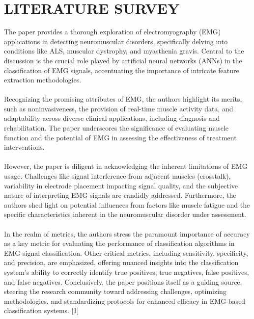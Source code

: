 \documentclass[ 12pt,a4paper,twocolumn,fleqn]{report}
\begin{document}
\chapter{LITERATURE SURVEY}
The paper provides a thorough exploration of electromyography (EMG) applications in detecting
neuromuscular disorders, specifically delving into conditions like ALS, muscular dystrophy, and
myasthenia gravis. Central to the discussion is the crucial role played by artificial neural networks
(ANNs) in the classification of EMG signals, accentuating the importance of intricate feature extraction
methodologies.
\\
\hfill
\\
Recognizing the promising attributes of EMG, the authors highlight its merits, such as noninvasiveness, the provision of real-time muscle activity data, and adaptability across diverse clinical
applications, including diagnosis and rehabilitation. The paper underscores the significance of
evaluating muscle function and the potential of EMG in assessing the effectiveness of treatment
interventions.
\\
\hfill
\\
However, the paper is diligent in acknowledging the inherent limitations of EMG usage. Challenges
like signal interference from adjacent muscles (crosstalk), variability in electrode placement impacting
signal quality, and the subjective nature of interpreting EMG signals are candidly addressed.
Furthermore, the authors shed light on potential influences from factors like muscle fatigue and the
specific characteristics inherent in the neuromuscular disorder under assessment.
\\
\hfill
\\
In the realm of metrics, the authors stress the paramount importance of accuracy as a key metric for
evaluating the performance of classification algorithms in EMG signal classification. Other critical
metrics, including sensitivity, specificity, and precision, are emphasized, offering nuanced insights into
the classification system's ability to correctly identify true positives, true negatives, false positives, and
false negatives. Conclusively, the paper positions itself as a guiding source, steering the research
community toward addressing challenges, optimizing methodologies, and standardizing protocols for
enhanced efficacy in EMG-based classification systems. [1]
\end{document}
